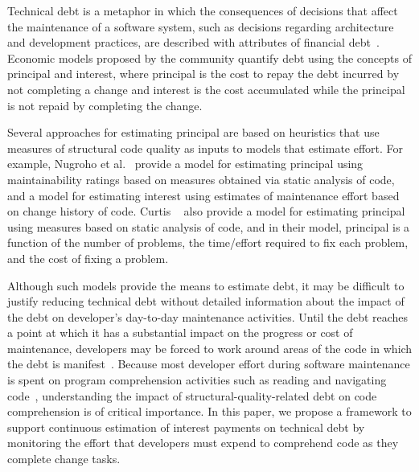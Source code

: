 Technical debt is a metaphor in which the consequences of decisions that affect the maintenance of a software system, such as decisions regarding architecture and development practices, are described with attributes of financial debt~\cite{Cunningham:1992}. Economic models proposed by the \TD community quantify debt using the concepts of principal and interest, where principal is the cost to repay the debt incurred by not completing a change and interest is the cost accumulated while the principal is not repaid by completing the change.

Several approaches for estimating principal are based on heuristics that use measures of structural code quality as inputs to models that estimate effort. For example, Nugroho et al.~\cite{Nugroho_etal:2011} provide a model for estimating principal using maintainability ratings based on measures obtained via static analysis of code, and a model for estimating interest using estimates of maintenance effort based on change history of code. Curtis \etal~\cite{Curtis_etal:2012} also provide a model for estimating principal using measures based on static analysis of code, and in their model, principal is a function of the number of problems, the time/effort required to fix each problem, and the cost of fixing a problem.  

Although such models provide the means to estimate debt, it may be difficult to justify reducing technical debt without detailed information about the impact of the debt on developer's day-to-day maintenance activities. Until the debt reaches a point at which it has a substantial impact on the progress or cost of maintenance, developers may be forced to work around areas of the code in which the debt is manifest~\cite{Ozkaya_etal:2011}. Because most developer effort during software maintenance is spent on program comprehension activities such as reading and navigating code~\cite{Fjeldstad_Hamlen:1982,Standish:1984,vonMayrhauser_etal:1997,Ko_etal:2006,LaToza_etal:2006,Tiarks:2011}, understanding the impact of structural-quality-related debt on code comprehension is of critical importance. In this paper, we propose a framework to support continuous estimation of interest payments on technical debt by monitoring the effort that developers must expend to comprehend code as they complete change tasks. 

